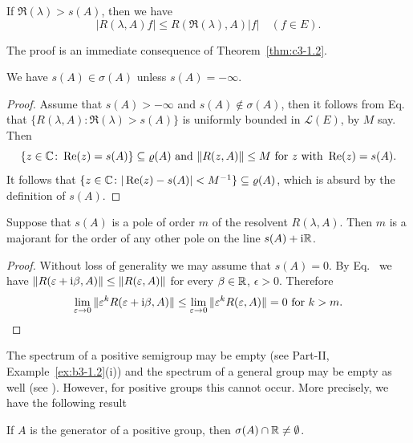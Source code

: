 \begin{corollary}\label{cor:c3-1.3}
If\/ $\Re(\lambda) > s(A)$, then we have
\begin{equation}\label{eq:c3-1.5}
	|R(\lambda,A)f| \leq R(\Re(\lambda),A) |f| \quad (f \in E).
\end{equation}
\end{corollary}
The proof is an immediate consequence of Theorem~\ref{thm:c3-1.2}.
\begin{corollary}\label{cor:c3-1.4}
We have $s(A) \in \sigma(A)$ unless $s(A) = -\infty$.
\end{corollary}
\begin{proof}
Assume that $s(A) > -\infty$ and $s(A) \notin \sigma(A)$, then it follows from Eq.~ that $\{R(\lambda,A) \colon \Re(\lambda) > s(A)\}$ is uniformly bounded in $\mathcal{L}(E)$, by $M$ say. 
Then
\[
\{z \in \C  \colon \Re(z) = s(A)\} \subseteq \rho(A) \text{ and } 
\|R(z,A)\| \leq M \text{ for } z  \text{ with } \Re(z) = s(A) .
\]
It follows that $\{z \in \C  \colon |\Re(z) - s(A)| < M^{-1}\} \subseteq \rho(A)$, which is absurd by the definition of\/ $s(A)$.
\end{proof}
\begin{corollary}\label{cor:c3-1.5}
Suppose that $s(A)$ is a pole%
of order $m$ of the resolvent $R(\lambda,A)$.
Then $m$ is a majorant for the order of any other pole on the line $s(A) + \mathrm{i}\mathbb{R} $.
\end{corollary}
\begin{proof}
Without loss of generality we may assume that $s(A) = 0$.
By Eq.~ we have $\|R(\epsilon+\im\beta ,A)\| \leq \|R(\epsilon,A)\|$ for every $\beta \in \mathbb{R} $, $\epsilon > 0$.
Therefore 
\begin{equation*}
\lim_{\epsilon\to 0}\|\epsilon^k R(\epsilon+\im\beta ,A)\| \leq \lim_{\epsilon\to 0}\|\epsilon^k R(\epsilon,A)\| = 0 \text{ for } k > m .
\qedhere
\end{equation*}
\end{proof}
The spectrum of a positive semigroup may be empty (see Part-II, Example~\ref{ex:b3-1.2}(i)) and the spectrum of a general group may be empty as well (see \textcite[Section~23.16]{hillephillips:1957}).
However, for positive groups this cannot occur.
More precisely, we have the following result
\begin{corollary}\label{cor:c3-1.6}
If\/ $A$ is the generator of a positive group, then $\sigma(A)\cap\mathbb{R}  \neq \emptyset$. 
\end{corollary}
